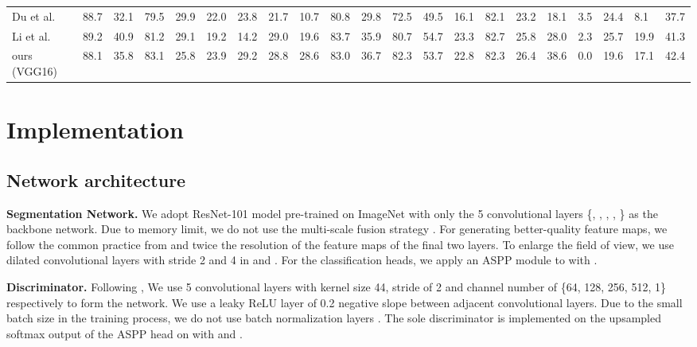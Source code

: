 \documentclass[10pt,twocolumn,letterpaper]{article}
\begin{document}
\begin{table*}[t!]
\begin{center}
\begin{tabular}{ l|p{0.28cm}p{0.28cm}p{0.28cm}p{0.28cm}p{0.28cm}p{0.28cm}p{0.28cm}p{0.28cm}p{0.28cm}p{0.28cm}p{0.28cm}p{0.28cm}p{0.28cm}p{0.28cm}p{0.28cm}p{0.28cm}p{0.28cm}p{0.28cm}p{0.28cm}c }
\midrule
Du et al. \cite{Du_2019_ICCV} & 88.7 & 32.1 & 79.5 & 29.9 & 22.0 & 23.8 & 21.7 & 10.7 & 80.8 & 29.8 & 72.5 & 49.5 & 16.1 & 82.1 & 23.2 & 18.1 & 3.5 & 24.4 & 8.1 & 37.7 \\
Li et al. \cite{bidir} & 89.2 & 40.9 & 81.2 & 29.1 & 19.2 & 14.2 & 29.0 & 19.6 & 83.7 & 35.9 & 80.7 & 54.7 & 23.3 & 82.7 & 25.8 & 28.0 & 2.3 & 25.7 & 19.9 & 41.3 \\
\hline
ours (VGG16) & 88.1 & 35.8 & 83.1 & 25.8 & 23.9 & 29.2 & 28.8 & 28.6 & 83.0 & 36.7 & 82.3 & 53.7 & 22.8 & 82.3 & 26.4 & 38.6 & 0.0 & 19.6 &17.1 & 42.4\\
\bottomrule

\end{tabular}
\end{center}
\label{gta2city}
\vspace{-6mm}
\end{table*} 
\section{Implementation}
\subsection{Network architecture}
\textbf{Segmentation Network.} We adopt ResNet-101 model \cite{resnet} pre-trained on ImageNet \cite{imagenet} with only the 5 convolutional layers \{, , , , \} as the backbone network. Due to memory limit, we do not use the multi-scale fusion strategy \cite{multiscale}. For generating better-quality feature maps, we follow the common practice from \cite{deeplabv1, multiscale, outputspace} and twice the resolution of the feature maps of the final two layers. To enlarge the field of view, we use dilated convolutional layers \cite{multiscale} with stride 2 and 4 in  and . For the classification heads, we apply an ASPP module \cite{deeplabv2} to  with . 

\textbf{Discriminator.} Following \cite{outputspace}, We use 5 convolutional layers with kernel size 44, stride of 2 and channel number of \{64, 128, 256, 512, 1\} respectively to form the network. We use a leaky ReLU \cite{leakyrelu} layer of 0.2 negative slope between adjacent convolutional layers. Due to the small batch size in the training process, we do not use batch normalization layers \cite{batch}. The sole discriminator is implemented on the upsampled softmax output of the ASPP head on  with  and . 
\end{document}
